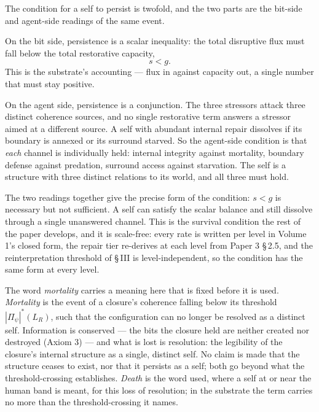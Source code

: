 \documentclass[11pt,oneside]{report}
\theoremstyle{definition}
\theoremstyle{remark}
\begin{document}
The condition for a self to persist is twofold, and the two parts are the bit-side and agent-side readings of the same event.

On the bit side, persistence is a scalar inequality: the total disruptive flux must fall below the total restorative capacity,
\[
s < g.
\]
This is the substrate's accounting --- flux in against capacity out, a single number that must stay positive.

On the agent side, persistence is a conjunction. The three stressors attack three distinct coherence sources, and no single restorative term answers a stressor aimed at a different source. A self with abundant internal repair dissolves if its boundary is annexed or its surround starved. So the agent-side condition is that \emph{each} channel is individually held: internal integrity against mortality, boundary defense against predation, surround access against starvation. The self is a structure with three distinct relations to its world, and all three must hold.

The two readings together give the precise form of the condition: \ensuremath{s < g} is necessary but not sufficient. A self can satisfy the scalar balance and still dissolve through a single unanswered channel. This is the survival condition the rest of the paper develops, and it is scale-free: every rate is written per level in Volume 1's closed form, the repair tier re-derives at each level from Paper 3 \S\,2.5, and the reinterpretation threshold of \S\,III is level-independent, so the condition has the same form at every level.

The word \emph{mortality} carries a meaning here that is fixed before it is used. \emph{Mortality} is the event of a closure's coherence falling below its threshold \ensuremath{|\Pi_\psi|^*(L_R)}, such that the configuration can no longer be resolved as a distinct self. Information is conserved --- the bits the closure held are neither created nor destroyed (Axiom 3) --- and what is lost is resolution: the legibility of the closure's internal structure as a single, distinct self. No claim is made that the structure ceases to exist, nor that it persists as a self; both go beyond what the threshold-crossing establishes. \emph{Death} is the word used, where a self at or near the human band is meant, for this loss of resolution; in the substrate the term carries no more than the threshold-crossing it names.
\end{document}
